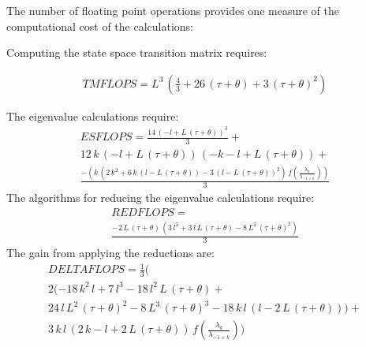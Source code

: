 
The number of floating point operations provides
one measure of the computational cost of the calculations:

Computing the state space transition matrix requires:

  \begin{multline*}
TMFLOPS={L^3}\,\left( {\frac{4}{3}} + 26\,\left( \tau + \theta \right)  + 
    3\,{{\left( \tau + \theta \right) }^2} \right) 
  \end{multline*}


The eigenvalue calculations require:
  \begin{multline*}
ESFLOPS={\frac{14\,{{\left( -l + L\,\left( \tau + \theta \right)  \right) }^3}}{3}}+\\
12\,k\,\left( -l + L\,\left( \tau + \theta \right)  \right) \,
  \left( -k - l + L\,\left( \tau + \theta \right)  \right) +\\
{\frac{-\left( k\,\left( 2\,{k^2} + 
         6\,k\,\left( l - L\,\left( \tau + \theta \right)  \right)  - 
         3\,{{\left( l - L\,\left( \tau + \theta \right)  \right) }^2} \right)
         \,f({\frac{{{\lambda}_k}}{{{\lambda}_{-1 + k}}}}) \right) }{3}}
  \end{multline*}
The algorithms for reducing the eigenvalue calculations require:
  \begin{multline*}
REDFLOPS=\\
{\frac{-2\,L\,\left( \tau + \theta \right) \,
     \left( 3\,{l^2} + 3\,l\,L\,\left( \tau + \theta \right)  - 
       8\,{L^2}\,{{\left( \tau + \theta \right) }^2} \right) }{3}}
  \end{multline*}
The gain from applying the reductions are:
  \begin{multline*}
DELTAFLOPS={\frac{1}{3}}(\\
2 ( -18\,{k^2}\,l + 7\,{l^3} - 18\,{l^2}\,L\,\left( \tau + \theta \right) +\\
24\,l\,{L^2}\,{{\left( \tau + \theta \right) }^2} - 
  8\,{L^3}\,{{\left( \tau + \theta \right) }^3} - 
  18\,k\,l\,\left( l - 2\,L\,\left( \tau + \theta \right)  \right) )+\\
3\,k\,l\,\left( 2\,k - l + 2\,L\,\left( \tau + \theta \right)  \right) \,
  f({\frac{{{\lambda}_k}}{{{\lambda}_{-1 + k}}}}))\\
  \end{multline*}
